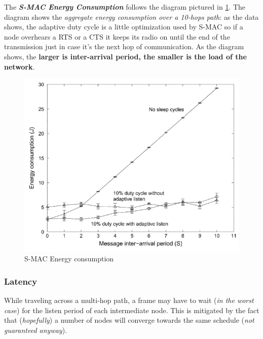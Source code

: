 \documentclass[10pt,a4paper]{report}
\theoremstyle{definition}
\begin{document}
The \textit{\textbf{S-MAC Energy Consumption}} follows the diagram pictured in \ref{smac-energy}. The  diagram shows the \textit{aggregate energy consumption over a 10-hops path}: as the data shows, the adaptive duty cycle is a little optimization used by S-MAC so if a node overhears a RTS or a CTS it keeps its radio on until the end of the transmission just in case it's the next hop of communication.
As the diagram shows, the \textbf{larger is inter-arrival period, the smaller is the load of the network}.
\begin{figure}[h]
	\centering\includegraphics[scale=0.50]{images/Pasted image 20230404171944.png}
	\caption{S-MAC Energy consumption}
\label{smac-energy}
\end{figure}

\subsubsection{Latency}\label{sec:latency}
While traveling across a multi-hop path, a frame may have to wait (\textit{in the worst case}) for the listen period of each intermediate node.
This is mitigated by the fact that (\textit{hopefully}) a number of nodes will converge towards the same schedule (\textit{not guaranteed anyway}).
\end{document}
